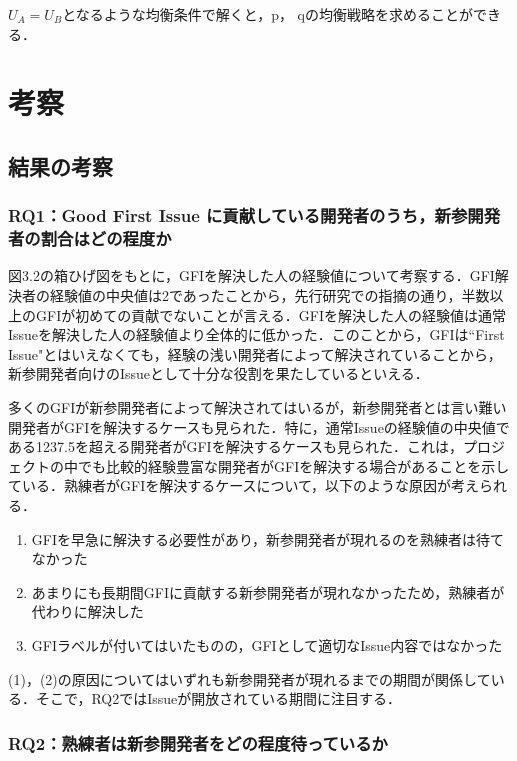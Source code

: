 \documentclass[11pt]{jreport}
\begin{document}
$U_A =U_B$となるような均衡条件で解くと，p， qの均衡戦略を求めることができる．



\chapter{考察}

\section{結果の考察}

\subsection{RQ1：Good First Issue に貢献している開発者のうち，新参開発者の割合はどの程度か }
図3.2の箱ひげ図をもとに，GFIを解決した人の経験値について考察する．GFI解決者の経験値の中央値は2であったことから，先行研究\cite{GFI_half}での指摘の通り，半数以上のGFIが初めての貢献でないことが言える．GFIを解決した人の経験値は通常Issueを解決した人の経験値より全体的に低かった．このことから，GFIは``First Issue"とはいえなくても，経験の浅い開発者によって解決されていることから，新参開発者向けのIssueとして十分な役割を果たしているといえる．

多くのGFIが新参開発者によって解決されてはいるが，新参開発者とは言い難い開発者がGFIを解決するケースも見られた．特に，通常Issueの経験値の中央値である1237.5を超える開発者がGFIを解決するケースも見られた．これは，プロジェクトの中でも比較的経験豊富な開発者がGFIを解決する場合があることを示している．熟練者がGFIを解決するケースについて，以下のような原因が考えられる．

\def\labelenumi{(\theenumi)}

\begin{enumerate}
  \item GFIを早急に解決する必要性があり，新参開発者が現れるのを熟練者は待てなかった
  \item あまりにも長期間GFIに貢献する新参開発者が現れなかったため，熟練者が代わりに解決した
  \item GFIラベルが付いてはいたものの，GFIとして適切なIssue内容ではなかった
\end{enumerate}

(1)，(2)の原因についてはいずれも新参開発者が現れるまでの期間が関係している．そこで，RQ2ではIssueが開放されている期間に注目する．

\subsection{RQ2：熟練者は新参開発者をどの程度待っているか}
\end{document}
